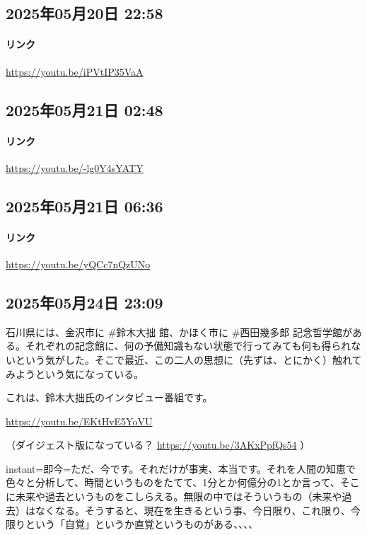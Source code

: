 \subsection*{2025年05月20日 22:58}

\paragraph{リンク}
\url{https://youtu.be/iPVtIP35VaA}

\subsection*{2025年05月21日 02:48}

\paragraph{リンク}
\url{https://youtu.be/-lg0Y4sYATY}

\subsection*{2025年05月21日 06:36}

\paragraph{リンク}
\url{https://youtu.be/yQCc7nQzUNo}

\subsection*{2025年05月24日 23:09}

石川県には、金沢市に \#鈴木大拙 館、かほく市に \#西田幾多郎 記念哲学館がある。それぞれの記念館に、何の予備知識もない状態で行ってみても何も得られないという気がした。そこで最近、この二人の思想に（先ずは、とにかく）触れてみようという気になっている。

これは、鈴木大拙氏のインタビュー番組です。

\url{https://youtu.be/EKtHvE5YoVU}

（ダイジェスト版になっている？ \url{https://youtu.be/3AKxPpfQs54} ）

instant=即今=ただ、今です。それだけが事実、本当です。それを人間の知恵で色々と分析して、時間というものをたてて、1分とか何億分の1とか言って、そこに未来や過去というものをこしらえる。無限の中ではそういうもの（未来や過去）はなくなる。そうすると、現在を生きるという事、今日限り、これ限り、今限りという「自覚」というか直覚というものがある、、、、


